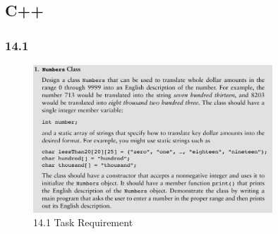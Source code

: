 \documentclass{article}
\begin{document}
\subsection*{C++}

\subsubsection*{14.1}

\begin{figure}[H]
    \centering
    \includegraphics[width=0.8\textwidth]{./Assets/Task requirements/Assignment11/14.1.png}
    \caption{14.1 Task Requirement}
\end{figure}
\end{document}
